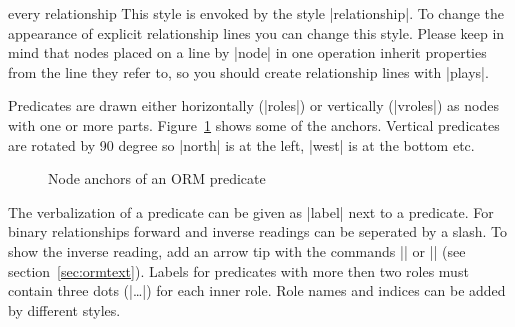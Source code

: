 \documentclass[a4paper,10pt]{article}
\begin{document}
\begin{stylekey}{every relationship}
  This style is envoked by the style |relationship|. To change the appearance of explicit relationship lines you can change this style. Please keep in mind that nodes placed on a line by |node| in one operation inherit properties from  the line they refer to, so you should create relationship lines with |plays|.
\begin{codeexample}[width=3cm]
\end{codeexample}
\end{stylekey}

\noindent
Predicates are drawn either horizontally (|roles|) or vertically (|vroles|) as nodes with one or more parts. Figure~\ref{fig:hanchors} shows some of the anchors. Vertical predicates are rotated by 90 degree so |north| is at the left, |west| is at the bottom etc.

\begin{figure}[h]
\centering
\begin{codeexample}[width=10cm]
\Large
{}
\end{codeexample}
\label{fig:hanchors}
\caption{Node anchors of an ORM predicate}
\end{figure}

\noindent
The verbalization of a predicate can be given as |label| next to a predicate. For binary relationships forward and inverse readings can be seperated by a slash. To show the inverse reading, add an arrow tip with the commands |\ormleft| or |\ormup| (see section~\ref{sec:ormtext}). Labels for predicates with more then two roles must contain three dots (|\ldots|) for each inner role. Role names and indices can be added by different styles.
\end{document}
